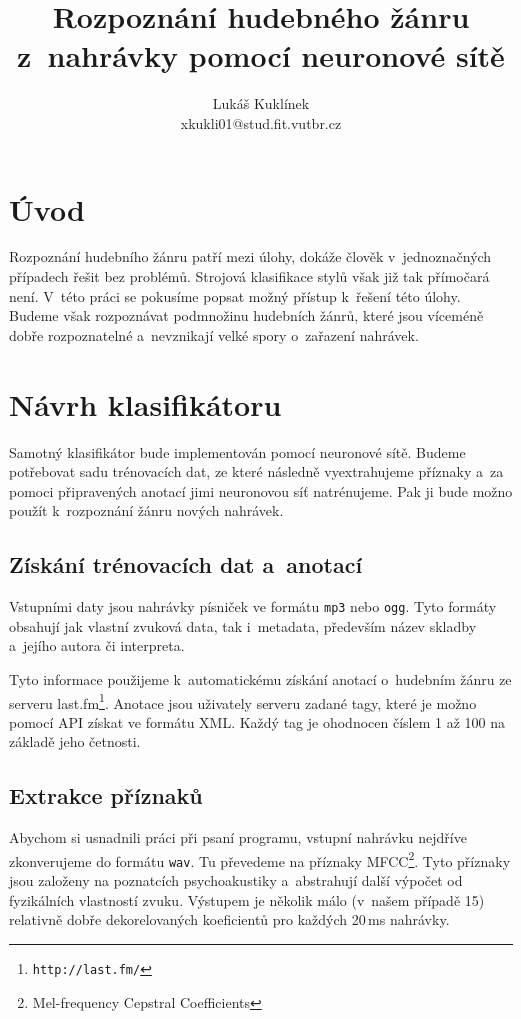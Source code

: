 \documentclass[10pt,a4paper]{article}
\title{Rozpoznání hudebného žánru z~nahrávky pomocí neuronové sítě}
\author{Lukáš Kuklínek\\xkukli01@stud.fit.vutbr.cz}
\date{}
\begin{document}
\maketitle

\section{Úvod}

Rozpoznání hudebního žánru patří mezi úlohy, dokáže člověk v~jednoznačných případech řešit bez problémů.
Strojová klasifikace stylů však již tak přímočará není.
V~této práci se pokusíme popsat možný přístup k~řešení této úlohy.
Budeme však rozpoznávat podmnožinu hudebních žánrů, které jsou víceméně dobře rozpoznatelné
a~nevznikají velké spory o~zařazení nahrávek.

\section{Návrh klasifikátoru}

Samotný klasifikátor bude implementován pomocí neuronové sítě.
Budeme potřebovat sadu trénovacích dat, ze které následně vyextrahujeme příznaky
a~za pomoci připravených anotací jimi neuronovou síť natrénujeme.
Pak ji bude možno použít k~rozpoznání žánru nových nahrávek.

\subsection{Získání trénovacích dat a~anotací}

Vstupními daty jsou nahrávky písniček ve formátu \verb|mp3| nebo \verb|ogg|.
Tyto formáty obsahují jak vlastní zvuková data, tak i~metadata, především název
skladby a~jejího autora či interpreta.

Tyto informace použijeme k~automatickému získání anotací
o~hudebním žánru ze serveru last.fm\footnote{\texttt{http://last.fm/}}.
Anotace jsou uživately serveru zadané tagy, které je možno pomocí API získat ve formátu XML.
Každý tag je ohodnocen číslem 1 až 100 na základě jeho četnosti.

\subsection{Extrakce příznaků}

Abychom si usnadnili práci při psaní programu,
vstupní nahrávku nejdříve zkonverujeme do formátu \verb|wav|.
Tu převedeme na příznaky MFCC\footnote{Mel-frequency Cepstral Coefficients}.
Tyto příznaky jsou založeny na poznatcích psychoakustiky a~abstrahují
další výpočet od fyzikálních vlastností zvuku.
Výstupem je několik málo (v~našem případě 15) relativně dobře dekorelovaných koeficientů
pro každých 20\,ms nahrávky.
\end{document}
